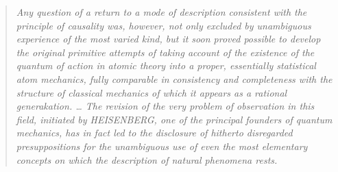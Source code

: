 \documentclass[11pt]{article}
\newcommand{\olg}[1]{{\setlength{\fboxsep}{0.8pt}\colorbox{cyan!25}{#1}}}
\begin{document}
{\footnotesize\begin{quote}\itshape
Any question of a return to a mode of description consistent with the principle of causality was, however, not only excluded by \olg{unambiguous} experience of the most varied kind, but it soon proved possible to develop the original primitive attempts of taking account of the existence of the quantum of action in atomic theory into a proper, essentially statistical atom mechanics, fully comparable in consistency and completeness with the structure of classical mechanics of which it appears as a rational generakation. … The revision of the very problem of observation in this field, initiated by HEISENBERG, one of the principal founders of quantum mechanics, has in fact led to the disclosure of hitherto disregarded presuppositions for the \olg{unambiguous} use of even the most elementary concepts on which the description of natural phenomena rests.
\end{quote}}
\end{document}
